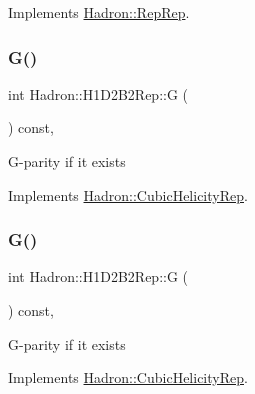Implements \mbox{\hyperlink{structHadron_1_1RepRep_a92c8802e5ed7afd7da43ccfd5b7cd92b}{Hadron\+::\+Rep\+Rep}}.

\mbox{\label{structHadron_1_1H1D2B2Rep_a8a24864ed3b1e7faee9eee169fc3470b}} 
\subsubsection{\texorpdfstring{G()}{G()}\hspace{0.1cm}{\footnotesize\ttfamily [1/3]}}
{\footnotesize\ttfamily int Hadron\+::\+H1\+D2\+B2\+Rep\+::G (\begin{DoxyParamCaption}{ }\end{DoxyParamCaption}) const\hspace{0.3cm}{\ttfamily [inline]}, {\ttfamily [virtual]}}

G-\/parity if it exists 

Implements \mbox{\hyperlink{structHadron_1_1CubicHelicityRep_a50689f42be1e6170aa8cf6ad0597018b}{Hadron\+::\+Cubic\+Helicity\+Rep}}.

\mbox{\label{structHadron_1_1H1D2B2Rep_a8a24864ed3b1e7faee9eee169fc3470b}} 
\subsubsection{\texorpdfstring{G()}{G()}\hspace{0.1cm}{\footnotesize\ttfamily [2/3]}}
{\footnotesize\ttfamily int Hadron\+::\+H1\+D2\+B2\+Rep\+::G (\begin{DoxyParamCaption}{ }\end{DoxyParamCaption}) const\hspace{0.3cm}{\ttfamily [inline]}, {\ttfamily [virtual]}}

G-\/parity if it exists 

Implements \mbox{\hyperlink{structHadron_1_1CubicHelicityRep_a50689f42be1e6170aa8cf6ad0597018b}{Hadron\+::\+Cubic\+Helicity\+Rep}}.

\mbox{\label{structHadron_1_1H1D2B2Rep_a8a24864ed3b1e7faee9eee169fc3470b}} 
